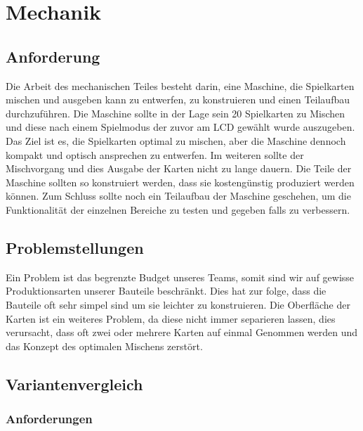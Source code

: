 \chapter{Mechanik}

\section{Anforderung}
\label{sec:Anforderung}
Die Arbeit des mechanischen Teiles besteht darin, eine Maschine,
die Spielkarten mischen und ausgeben kann zu entwerfen, zu konstruieren
und einen Teilaufbau durchzuführen. Die Maschine sollte in der Lage
sein 20 Spielkarten zu Mischen und diese nach einem Spielmodus der
zuvor am LCD gewählt wurde auszugeben. Das Ziel ist es, die Spielkarten
optimal zu mischen, aber die Maschine dennoch kompakt und optisch
ansprechen zu entwerfen. Im weiteren sollte der Mischvorgang und dies
Ausgabe der Karten nicht zu lange dauern. Die Teile der Maschine
sollten so konstruiert werden, dass sie kostengünstig produziert
werden können. Zum Schluss sollte noch ein Teilaufbau der Maschine
geschehen, um die Funktionalität der einzelnen Bereiche zu testen
und gegeben falls zu verbessern.

\section{Problemstellungen}
Ein Problem ist das begrenzte Budget unseres Teams, somit sind
wir auf gewisse Produktionsarten unserer Bauteile beschränkt.
Dies hat zur folge, dass die Bauteile oft sehr simpel sind um
sie leichter zu konstruieren. Die Oberfläche der Karten ist ein
weiteres Problem, da diese nicht immer separieren lassen, dies
verursacht, dass oft zwei oder mehrere Karten auf einmal Genommen
werden und das Konzept des optimalen Mischens zerstört.

\section{Variantenvergleich}

\subsection{Anforderungen}

